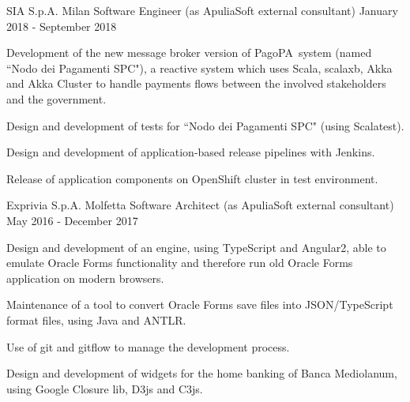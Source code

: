 \documentclass{resume} %
\begin{document}

\cvEntry
  {SIA S.p.A.}
  {Milan}
  {Software Engineer (as ApuliaSoft external consultant)}
  {January 2018 - September 2018}{
    \begin{cvEntryItems}
      \item Development of the new message broker version of PagoPA\textregistered~system
            (named ``Nodo dei Pagamenti SPC"), a reactive system which uses Scala, scalaxb, Akka
            and Akka Cluster to handle payments flows between the involved stakeholders and the
            government.
      \item Design and development of tests for ``Nodo dei Pagamenti SPC" (using Scalatest).
      \item Design and development of application-based release pipelines with Jenkins.
      \item Release of application components on OpenShift cluster in test environment.
    \end{cvEntryItems}
  }


\cvEntry
  {Exprivia S.p.A.}
  {Molfetta}
  {Software Architect (as ApuliaSoft external consultant)}
  {May 2016 - December 2017}{
    \begin{cvEntryItems}
      \item Design and development of an engine, using TypeScript and Angular2, able to
            emulate Oracle Forms functionality and therefore run old Oracle Forms application
            on modern browsers.
      \item Maintenance of a tool to convert Oracle Forms save files into JSON/TypeScript
            format files, using Java and ANTLR.
      \item Use of git and gitflow to manage the development process.
      \item Design and development of widgets for the home banking of Banca Mediolanum,
            using Google Closure lib, D3js and C3js.
    \end{cvEntryItems}
  }

\end{document}
